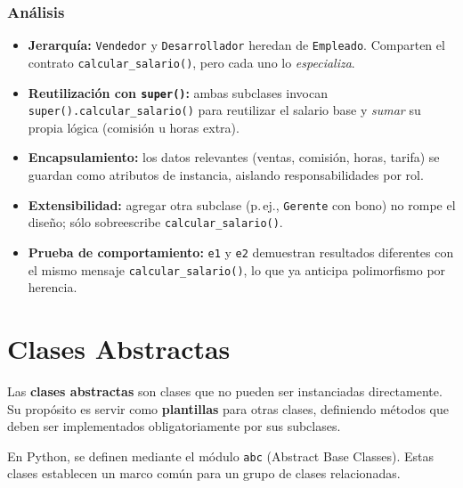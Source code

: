 \documentclass[12pt,a4paper]{article}
\begin{document}
\subsubsection*{Análisis}
\begin{itemize}
    \item \textbf{Jerarquía:} \texttt{Vendedor} y \texttt{Desarrollador} heredan de \texttt{Empleado}. Comparten el contrato \texttt{calcular\_salario()}, pero cada uno lo \emph{especializa}.
    \item \textbf{Reutilización con \texttt{super()}:} ambas subclases invocan \texttt{super().calcular\_salario()} para reutilizar el salario base y \emph{sumar} su propia lógica (comisión u horas extra).
    \item \textbf{Encapsulamiento:} los datos relevantes (ventas, comisión, horas, tarifa) se guardan como atributos de instancia, aislando responsabilidades por rol.
    \item \textbf{Extensibilidad:} agregar otra subclase (p.\,ej., \texttt{Gerente} con bono) no rompe el diseño; sólo sobreescribe \texttt{calcular\_salario()}.
    \item \textbf{Prueba de comportamiento:} \texttt{e1} y \texttt{e2} demuestran resultados diferentes con el mismo mensaje \texttt{calcular\_salario()}, lo que ya anticipa polimorfismo por herencia.
\end{itemize}

\section{Clases Abstractas}
Las \textbf{clases abstractas} son clases que no pueden ser instanciadas directamente.  
Su propósito es servir como \textbf{plantillas} para otras clases, definiendo métodos que deben ser implementados obligatoriamente por sus subclases.

En Python, se definen mediante el módulo \texttt{abc} (Abstract Base Classes). Estas clases establecen un marco común para un grupo de clases relacionadas.
\end{document}
